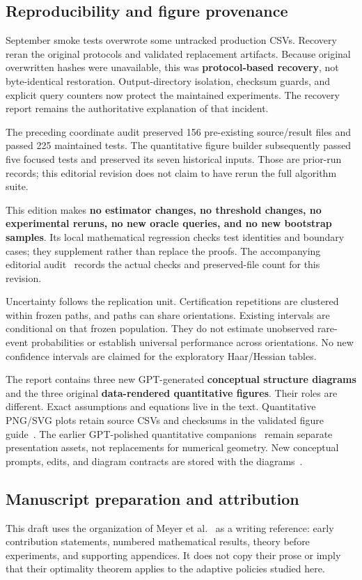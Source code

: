 \subsection{Reproducibility and figure provenance}
September smoke tests overwrote some untracked production CSVs. Recovery reran the original protocols and validated replacement artifacts. Because original overwritten hashes were unavailable, this was \textbf{protocol-based recovery}, not byte-identical restoration. Output-directory isolation, checksum guards, and explicit query counters now protect the maintained experiments. The recovery report remains the authoritative explanation of that incident.


The preceding coordinate audit preserved 156 pre-existing source/result files and passed 225 maintained tests. The quantitative figure builder subsequently passed five focused tests and preserved its seven historical inputs. Those are prior-run records; this editorial revision does not claim to have rerun the full algorithm suite.


This edition makes \textbf{no estimator changes, no threshold changes, no experimental reruns, no new oracle queries, and no new bootstrap samples}. Its local mathematical regression checks test identities and boundary cases; they supplement rather than replace the proofs. The accompanying editorial audit~\cite{project2026} records the actual checks and preserved-file count for this revision.


Uncertainty follows the replication unit. Certification repetitions are clustered within frozen paths, and paths can share orientations. Existing intervals are conditional on that frozen population. They do not estimate unobserved rare-event probabilities or establish universal performance across orientations. No new confidence intervals are claimed for the exploratory Haar/Hessian tables.


The report contains three new GPT-generated \textbf{conceptual structure diagrams} and the three original \textbf{data-rendered quantitative figures}. Their roles are different. Exact assumptions and equations live in the text. Quantitative PNG/SVG plots retain source CSVs and checksums in the validated figure guide~\cite{project2026}. The earlier GPT-polished quantitative companions~\cite{project2026} remain separate presentation assets, not replacements for numerical geometry. New conceptual prompts, edits, and diagram contracts are stored with the diagrams~\cite{project2026}.


\subsection{Manuscript preparation and attribution}
This draft uses the organization of Meyer et al.~\cite{meyer2021} as a
writing reference: early contribution statements, numbered mathematical
results, theory before experiments, and supporting appendices.
It does not copy their prose or imply that their optimality theorem applies
to the adaptive policies studied here.

